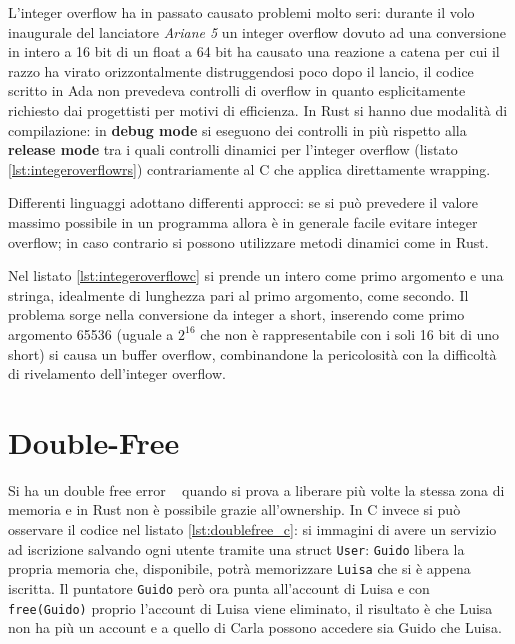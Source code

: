 \documentclass[Lau,binding=0.6cm]{sapthesis}
\newcommand{\textcode}[1]{\colorbox{backcolour}{\texttt{#1}}}
\begin{document}
L'integer overflow ha in passato causato problemi molto seri: durante il volo inaugurale del lanciatore \textit{Ariane 5} un integer overflow dovuto ad una conversione in intero a 16 bit di un float a 64 bit ha causato una reazione a catena per cui il razzo ha virato orizzontalmente distruggendosi poco dopo il lancio, il codice scritto in Ada non prevedeva controlli di overflow in quanto esplicitamente richiesto dai progettisti per motivi di efficienza. 
In Rust si hanno due modalità di compilazione: in \textbf{debug mode} si eseguono dei controlli in più rispetto alla \textbf{release mode} tra i quali controlli dinamici per l'integer overflow (listato \ref{lst:integeroverflowrs}) contrariamente al C che applica direttamente wrapping.

Differenti linguaggi adottano differenti approcci: se si può prevedere il valore massimo possibile in un programma allora è in generale facile evitare integer overflow; in caso contrario si possono utilizzare metodi dinamici come in Rust. 




Nel listato \ref{lst:integeroverflowc} si prende un intero come primo argomento e una stringa, idealmente di lunghezza pari al primo argomento, come secondo.
Il problema sorge nella conversione da integer a short, inserendo come primo argomento 65536 (uguale a $ 2^{16} $ che non è rappresentabile con i soli 16 bit di uno short) si causa un buffer overflow, combinandone la pericolosità con la difficoltà di rivelamento dell'integer overflow.




\section{Double-Free} \label{sec:double_free}
Si ha un double free error ~\cite[10.4.4]{gollmann:computersecurity} quando si prova a liberare più volte la stessa zona di memoria e in Rust non è possibile grazie all'ownership.
In C invece si può osservare il codice nel listato \ref{lst:doublefree_c}: si immagini di avere un servizio ad iscrizione salvando ogni utente tramite una struct \textcode{User}: \textcode{Guido} libera la propria memoria che, disponibile, potrà memorizzare \textcode{Luisa} che si è appena iscritta. Il puntatore \textcode{Guido} però ora punta all'account di Luisa e con \textcode{free(Guido)} proprio l'account di Luisa viene eliminato, il risultato è che Luisa non ha più un account e a quello di Carla possono accedere sia Guido che Luisa.
\end{document}
